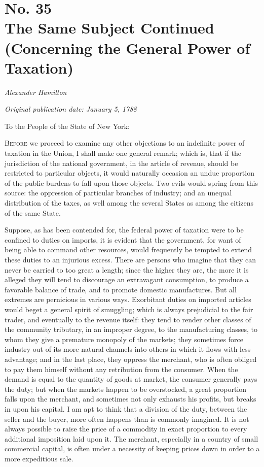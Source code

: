 \chapter[No. 35: The Same Subject Continued (Concerning the General Power of Taxation)]{No. 35\\ {\small The Same Subject Continued (Concerning the General Power of Taxation)}}

\textit{Alexander Hamilton}

\textit{Original publication date: January 5, 1788}
\vspace{1cm}

To the People of the State of New York:
\vspace{.4cm}

\textsc{Before} we proceed to examine any other objections to an indefinite power of taxation in the Union, I shall make one general remark; which is, that if the jurisdiction of the national government, in the article of revenue, should be restricted to particular objects, it would naturally occasion an undue proportion of the public burdens to fall upon those objects. 
Two evils would spring from this source: the oppression of particular branches of industry; and an unequal distribution of the taxes, as well among the several States as among the citizens of the same State.

Suppose, as has been contended for, the federal power of taxation were to be confined to duties on imports, it is evident that the government, for want of being able to command other resources, would frequently be tempted to extend these duties to an injurious excess. 
There are persons who imagine that they can never be carried to too great a length; since the higher they are, the more it is alleged they will tend to discourage an extravagant consumption, to produce a favorable balance of trade, and to promote domestic manufactures. 
But all extremes are pernicious in various ways. 
Exorbitant duties on imported articles would beget a general spirit of smuggling; which is always prejudicial to the fair trader, and eventually to the revenue itself: they tend to render other classes of the community tributary, in an improper degree, to the manufacturing classes, to whom they give a premature monopoly of the markets; they sometimes force industry out of its more natural channels into others in which it flows with less advantage; and in the last place, they oppress the merchant, who is often obliged to pay them himself without any retribution from the consumer. 
When the demand is equal to the quantity of goods at market, the consumer generally pays the duty; but when the markets happen to be overstocked, a great proportion falls upon the merchant, and sometimes not only exhausts his profits, but breaks in upon his capital. 
I am apt to think that a division of the duty, between the seller and the buyer, more often happens than is commonly imagined. 
It is not always possible to raise the price of a commodity in exact proportion to every additional imposition laid upon it. 
The merchant, especially in a country of small commercial capital, is often under a necessity of keeping prices down in order to a more expeditious sale.

